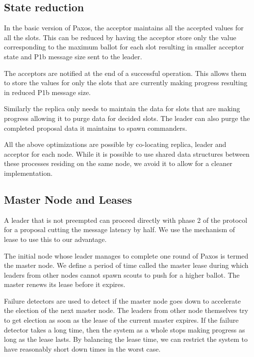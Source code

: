 \subsection{State reduction}

In the basic version of Paxos, the acceptor maintains all the accepted values
for all the slots. This can be reduced by having the acceptor store only the
value corresponding to the maximum ballot for each slot resulting in smaller
acceptor state and P1b message size sent to the leader.

The acceptors are notified at the end of a successful operation. This allows
them to store the values for only the slots that are currently making
progress resulting in reduced P1b message size.

Similarly the replica only needs to maintain the data for slots that are
making progress allowing it to purge data for decided slots. The leader can
also purge the completed proposal data it maintains to spawn commanders.

All the above optimizations are possible by co-locating replica, leader
and acceptor for each node. While it is possible to use shared data structures
between these processes residing on the same node, we avoid it to allow for
a cleaner implementation.

\subsection{Master Node and Leases}
\label{section:a.n.d.lease}

A leader that is not preempted can proceed directly with phase 2 of the
protocol for a proposal cutting the message latency by half. We use the
mechanism of lease to use this to our advantage.

The initial node whose leader manages to complete one round of Paxos is
termed the master node. We define a period of time called the master lease
during which leaders from other nodes cannot spawn scouts to push for a
higher ballot. The master renews its lease before it expires.

Failure detectors%
are used to detect if the master node goes down to accelerate the election
of the next master node. The leaders from other node themselves try to
get election as soon as the lease of the current master expires. If the
failure detector takes a long time, then the system as a whole
stops making progress as long as the lease lasts. By balancing the lease
time, we can restrict the system to have reasonably short down times in
the worst case.

